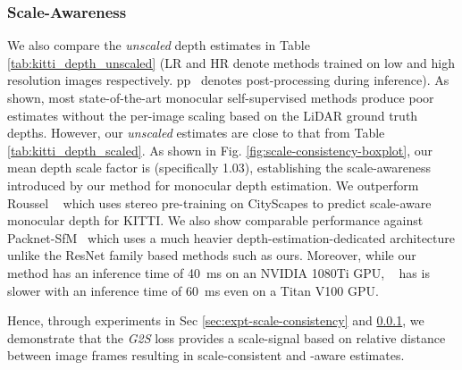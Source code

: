 \subsubsection{Scale-Awareness}
\label{sec:expt-scale-awareness}
We also compare the \textit{unscaled} depth estimates in Table \ref{tab:kitti_depth_unscaled} (LR and HR denote methods trained on low and high resolution  images respectively. pp~\cite{godard2019digging} denotes post-processing during inference). 
As shown, most state-of-the-art monocular self-supervised methods produce poor estimates without the per-image scaling based on the LiDAR ground truth depths. However, our \textit{unscaled} estimates are close to that from Table \ref{tab:kitti_depth_scaled}. As shown in Fig. \ref{fig:scale-consistency-boxplot}, our mean depth scale factor is   (specifically 1.03), establishing the scale-awareness introduced by our method for monocular depth estimation. 
We outperform Roussel \etal~\cite{roussel2019monocular} which uses stereo pre-training on CityScapes to predict scale-aware monocular depth for KITTI. We also show comparable performance against  Packnet-SfM~\cite{guizilini20203d}
which uses a much heavier depth-estimation-dedicated architecture unlike the ResNet family based methods such as ours. Moreover, while our method has an inference time of \SI{40}{ms} on an NVIDIA 1080Ti GPU, ~\cite{guizilini20203d} has is slower with an inference time of \SI{60}{ms} even on a Titan V100 GPU.   

Hence, through experiments in Sec \ref{sec:expt-scale-consistency} and \ref{sec:expt-scale-awareness}, we demonstrate that the \textit{G2S} loss provides a scale-signal based on relative distance between image frames  resulting in scale-consistent and -aware estimates.






